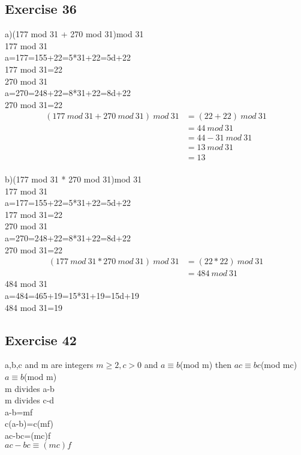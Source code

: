 \documentclass[12pt]{article}
\begin{document}
\subsection*{Exercise 36}
a)(177 mod 31 + 270 mod 31)mod 31\\
177 mod 31\\
a=177=155+22=5*31+22=5d+22\\
177 mod 31=22\\
270 mod 31\\
a=270=248+22=8*31+22=8d+22\\
270 mod 31=22\\
\begin{equation}\nonumber
    \begin{split}
        (177~mod~31+270~mod~31)~mod~31&=(22+22)~mod~31\\
        &=44~mod~31\\
        &=44-31~mod~31\\
        &=13~mod~31\\
        &=13
    \end{split}
\end{equation}
\\
b)(177 mod 31 * 270 mod 31)mod 31\\
177 mod 31\\
a=177=155+22=5*31+22=5d+22\\
177 mod 31=22\\
270 mod 31\\
a=270=248+22=8*31+22=8d+22\\
270 mod 31=22
\begin{equation}\nonumber
    \begin{split}
        (177~mod~31*270~mod~31)~mod~31&=(22*22)~mod~31\\
        &=484~mod~31
    \end{split}
\end{equation}
484 mod 31\\
a=484=465+19=15*31+19=15d+19\\
484 mod 31=19\\

\subsection*{Exercise 42}
a,b,c and m are integers $m\geq 2,c>0$ and $a\equiv b$(mod m) then $ac\equiv bc$(mod mc)\\
$a\equiv b$(mod m)\\
m divides a-b\\
m divides c-d\\
a-b=mf\\
c(a-b)=c(mf)\\
ac-bc=(mc)f\\
$ac-bc\equiv(mc)f$\\
\end{document}
